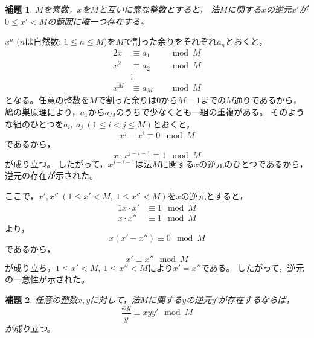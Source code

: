 \documentclass{article}
\makeatletter
\renewenvironment{proof}[1][\proofname]{\par
        \pushQED{\qed}
        \normalfont
        \topsep6\p@\@plus6\p@ \trivlist
        \item[\hskip\labelsep{\bfseries #1}\@addpunct{\bfseries}]\ignorespaces
    }{%
        \popQED\endtrivlist\@endpefalse
    }
\renewcommand{\proofname}{証明.}
\newtheorem{lemma}{補題}
\makeatother
\begin{document}
\begin{screen}
    \begin{lemma}
        \label{lemma:inv:1}
        $M$を素数，$x$を$M$と互いに素な整数とすると，
        法$M$に関する$x$の逆元$x'$が$0 \leq x' < M$の範囲に唯一つ存在する。
    \end{lemma}
\end{screen}

\begin{proof}
    $x^n$ ($n$は自然数; $1 \leq n \leq M$)を$M$で割った余りをそれぞれ$a_n$とおくと，
    \begin{alignat}{2}
        x   &\equiv a_1   & &\mod{M} \\
        x^2 &\equiv a_2 & &\mod{M} \\
            &\vdots& & \\
        x^M &\equiv a_M & &\mod{M}
    \end{alignat}
    となる。任意の整数を$M$で割った余りは0から$M - 1$までの$M$通りであるから，
    鳩の巣原理により，$a_1$から$a_M$のうちで少なくとも一組の重複がある。
    そのような組のひとつを$a_i,\ a_j\ (1 \leq i < j \leq M)$とおくと，
    \begin{equation}
        x^j - x^i \equiv 0 \mod{M}
    \end{equation}
    であるから，
    \begin{equation}
        x \cdot x^{j - i - 1} \equiv 1 \mod{M}
    \end{equation}
    が成り立つ。
    したがって，$x^{j - i - 1}$は法$M$に関する$x$の逆元のひとつであるから，逆元の存在が示された。

    ここで，$x', x''\ (1 \leq x' < M,\ 1 \leq x'' < M)$を$x$の逆元とすると，
    \begin{alignat}{1}
        x \cdot x'  &\equiv 1 \mod{M} \\
        x \cdot x'' &\equiv 1 \mod{M}
    \end{alignat}
    より，
    \begin{equation}
        x (x' - x'') \equiv 0 \mod{M}
    \end{equation}
    であるから，
    \begin{equation}
        x' \equiv x'' \mod{M}
    \end{equation}
    が成り立ち，$1 \leq x' < M,\ 1 \leq x'' < M$により$x' = x''$である。
    したがって，逆元の一意性が示された。
\end{proof}

\begin{screen}
    \begin{lemma}
        \label{lemma:inv:2}
        任意の整数$x, y$に対して，法$M$に関する$y$の逆元$y'$が存在するならば，
        \begin{equation}
            \frac{xy}{y} \equiv xyy' \mod{M}
        \end{equation}
        が成り立つ。
    \end{lemma}
\end{screen}
\end{document}
